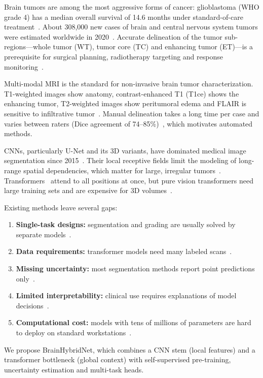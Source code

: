 \documentclass[pdflatex,sn-mathphys-num]{sn-jnl}
\begin{document}
Brain tumors are among the most aggressive forms of cancer: glioblastoma (WHO grade 4) has a median overall survival of 14.6 months under standard-of-care treatment~\cite{stupp2005}. About 308,000 new cases of brain and central nervous system tumors were estimated worldwide in 2020~\cite{sung2021globocan}. Accurate delineation of the tumor sub-regions---whole tumor (WT), tumor core (TC) and enhancing tumor (ET)---is a prerequisite for surgical planning, radiotherapy targeting and response monitoring~\cite{menze2015}.

Multi-modal MRI is the standard for non-invasive brain tumor characterization. T1-weighted images show anatomy, contrast-enhanced T1 (T1ce) shows the enhancing tumor, T2-weighted images show peritumoral edema and FLAIR is sensitive to infiltrative tumor~\cite{gordillo2013}. Manual delineation takes a long time per case and varies between raters (Dice agreement of 74--85\%)~\cite{menze2015}, which motivates automated methods.

CNNs, particularly U-Net and its 3D variants, have dominated medical image segmentation since 2015~\cite{ronneberger2015,cicek2016}. Their local receptive fields limit the modeling of long-range spatial dependencies, which matter for large, irregular tumors~\cite{dosovitskiy2021}. Transformers~\cite{vaswani2017} attend to all positions at once, but pure vision transformers need large training sets and are expensive for 3D volumes~\cite{dosovitskiy2021}.

Existing methods leave several gaps:
\begin{enumerate}
\item \textbf{Single-task designs:} segmentation and grading are usually solved by separate models~\cite{havaei2017}.
\item \textbf{Data requirements:} transformer models need many labeled scans~\cite{chen2021transunet}.
\item \textbf{Missing uncertainty:} most segmentation methods report point predictions only~\cite{gal2016}.
\item \textbf{Limited interpretability:} clinical use requires explanations of model decisions~\cite{litjens2017}.
\item \textbf{Computational cost:} models with tens of millions of parameters are hard to deploy on standard workstations~\cite{ker2018}.
\end{enumerate}

We propose BrainHybridNet, which combines a CNN stem (local features) and a transformer bottleneck (global context) with self-supervised pre-training, uncertainty estimation and multi-task heads.
\end{document}
